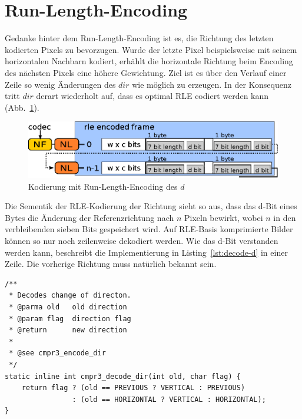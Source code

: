 \section{Run-Length-Encoding}
\label{sec:codec-rle}
Gedanke hinter dem Run-Length-Encoding ist es, die Richtung des letzten kodierten
Pixels zu bevorzugen. Wurde der letzte Pixel beispielsweise mit seinem
horizontalen Nachbarn kodiert, erh\"ahlt die horizontale Richtung beim Encoding
des n\"achsten Pixels eine h\"ohere Gewichtung. Ziel ist es \"uber den Verlauf
einer Zeile so wenig \"Anderungen des $dir$ wie m\"oglich zu erzeugen. In der
Konsequenz tritt $dir$ derart wiederholt auf, dass es optimal RLE codiert
werden kann (Abb.~\ref{fig:codec3d-rle}).
\\
\begin{figure}[tbhp]
\begin{center}
\includegraphics{img/codec3d-rle}
\end{center}
\caption{Kodierung mit Run-Length-Encoding des $d$}
\label{fig:codec3d-rle}
\end{figure}
%
Die Sementik der RLE-Kodierung der Richtung sieht so aus, dass das d-Bit eines
Bytes die \"Anderung der Referenzrichtung nach $n$ Pixeln bewirkt, wobei $n$ in
den verbleibenden sieben Bits gespeichert wird. Auf RLE-Basis komprimierte
Bilder k\"onnen so nur noch zeilenweise dekodiert werden. Wie das d-Bit
verstanden werden kann, beschreibt die Implementierung in 
Listing~\ref{lst:decode-d} in einer Zeile. Die vorherige Richtung muss nat\"urlich
bekannt sein.


\begin{lstlisting}[caption=Dekodierung d-Bits eines RLE-Bytes,%
                   label=lst:decode-d]
/**
 * Decodes change of directon.
 * @parma old   old direction
 * @param flag  direction flag
 * @return      new direction
 *
 * @see cmpr3_encode_dir
 */
static inline int cmpr3_decode_dir(int old, char flag) {
    return flag ? (old == PREVIOUS ? VERTICAL : PREVIOUS) 
                : (old == HORIZONTAL ? VERTICAL : HORIZONTAL);
}
\end{lstlisting}

